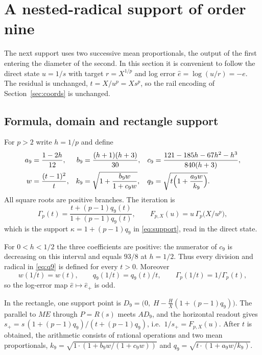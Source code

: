 \section{A nested-radical support of order nine}\label{sec:nested}

The next support uses two successive mean proportionals, the output of the first entering the diameter
of the second. In this section it is convenient to follow the direct state $u=1/s$ with target
$r=X^{1/p}$ and log error $\hat e=\log(u/r)=-e$. The residual is unchanged, $t=X/u^{p}=Xs^{p}$, so the
rail encoding of Section~\ref{sec:coords} is unchanged.

\subsection{Formula, domain and rectangle support}

For $p>2$ write $h=1/p$ and define
\begin{align}
a_9&=\frac{1-2h}{12}, & b_9&=\frac{(h+1)(h+3)}{30}, & c_9&=\frac{121-185h-67h^{2}-h^{3}}{840(h+3)},\label{eq:abc}\\
w&=\frac{(t-1)^{2}}{t}, & k_9&=\sqrt{1+\frac{b_9w}{1+c_9w}}, & q_9&=\sqrt{t\Bigl(1+\frac{a_9w}{k_9}\Bigr)}.\label{eq:q9}
\end{align}
All square roots are positive branches. The iteration is
\begin{equation}\label{eq:F}
\Gamma_p(t)=\frac{t+(p-1)q_9(t)}{1+(p-1)q_9(t)},\qquad F_{p,X}(u)=u\,\Gamma_p\bigl(X/u^{p}\bigr),
\end{equation}
which is the support $\kappa=1+(p-1)q_9$ in \eqref{eq:support}, read in the direct state.

For $0<h<1/2$ the three coefficients are positive: the numerator of $c_9$ is decreasing on this interval
and equals $93/8$ at $h=1/2$. Thus every division and radical in \eqref{eq:q9} is defined for every
$t>0$. Moreover
\begin{equation}\label{eq:recip}
w(1/t)=w(t),\qquad q_9(1/t)=q_9(t)/t,\qquad \Gamma_p(1/t)=1/\Gamma_p(t),
\end{equation}
so the log-error map $\hat e\mapsto\hat e_+$ is odd.

In the rectangle, one support point is $D_9=\bigl(0,\;H-\tfrac{H}{X}(1+(p-1)q_9)\bigr)$. The parallel
to $ME$ through $P=R(s)$ meets $AD_9$, and the horizontal readout gives
$s_+=s\,(1+(p-1)q_9)/(t+(p-1)q_9)$, i.e.\ $1/s_+=F_{p,X}(u)$. After $t$ is obtained, the arithmetic
consists of rational operations and two mean proportionals,
$k_9=\sqrt{1\cdot(1+b_9w/(1+c_9w))}$ and $q_9=\sqrt{t\cdot(1+a_9w/k_9)}$.

